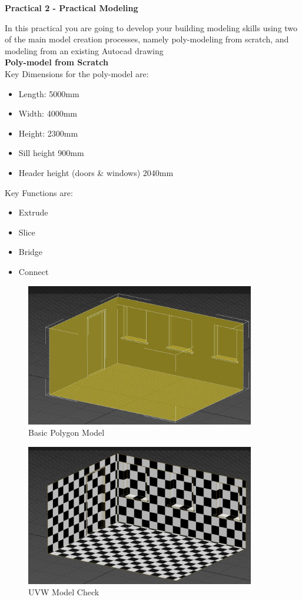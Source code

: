 
	
\begin{flushleft}
\Large\textbf{Practical 2 - Practical Modeling }\\
\end{flushleft}

In this practical you are going to develop your building modeling skills using two of the main model creation processes, namely poly-modeling from scratch, and modeling from an existing Autocad drawing\\


\textbf{Poly-model from Scratch}\\
Key Dimensions for the poly-model are:
\begin{itemize}
	\item Length: 5000mm
	\item Width: 4000mm
	\item Height: 2300mm
	\item Sill height 900mm
	\item Header height (doors \& windows) 2040mm
\end{itemize}

Key Functions are:
\begin{itemize}
	\item Extrude
	\item Slice
	\item Bridge
	\item Connect
\end{itemize}

\begin{figure}[ht]
	\centering
		\includegraphics[width=10cm]{./img/PolyModel.jpg}
		\caption{Basic Polygon Model}
	\label{fig:PM}
\end{figure}


\newpage
\vspace{1cm}
\begin{figure}[ht]
	\centering
		\includegraphics[width=10cm]{./img/PolyModelCheck.jpg}
		\caption{UVW Model Check}
	\label{fig:PMC}
\end{figure}



